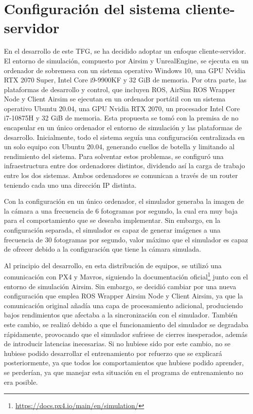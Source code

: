 \section{Configuración del sistema cliente-servidor}
\label{distribución}
En el desarrollo de este TFG, se ha decidido adoptar un enfoque cliente-servidor. El entorno de simulación, compuesto por Airsim y UnrealEngine, se ejecuta en un ordenador de sobremesa con un sistema 
operativo Windows 10, una GPU Nvidia RTX 2070 Super, Intel Core i9-9900KF y 32 GiB de memoria. Por otra parte, las plataformas de desarrollo y control, que incluyen ROS, AirSim ROS Wrapper Node y Client Airsim se ejecutan en un ordenador
portátil con un sistema operativo Ubuntu 20.04, una GPU Nvidia RTX 2070, un procesador Intel Core i7-10875H y 32 GiB de memoria.
Esta propuesta se tomó con la premisa de no encapsular en un único ordenador el entorno de simulación y las plataformas de desarrollo. Inicialmente, todo el sistema 
seguía una configuración centralizada en un solo equipo con Ubuntu 20.04, generando cuellos de botella y limitando al rendimiento del sistema. Para solventar estos problemas, 
se configuró una infraestructura entre dos ordenadores distintos, dividendo así la carga de trabajo entre los dos sistemas. Ambos ordenadores se comunican a través de un router teniendo cada uno una dirección IP distinta. 

Con la configuración en un único ordenador, el simulador generaba la imagen de la cámara a una frecuencia de 6 fotogramas por segundo, la cual era muy baja para el comportamiento que se 
deseaba implementar. Sin embargo, en la configuración separada, el simulador es capaz de generar imágenes a una frecuencia de 30 fotogramas por segundo, valor máximo que el simulador es 
capaz de ofrecer debido a la configuración que tiene la cámara simulada.

Al principio del desarrollo, en esta distribución de equipos, se utilizó una comunicación con PX4 y Mavros, siguiendo la documentación oficial\footnote{\url{https://docs.px4.io/main/en/simulation/}} 
junto con el entorno de simulación Airsim. Sin embargo, se decidió cambiar por una nueva configuración que emplea ROS Wrapper Airsim Node y Client Airsim, ya que 
la comunicación original añadía una capa de procesamiento adicional, produciendo bajos rendimientos que afectaba a la sincronización con el simulador. 
También este cambio, se realizó debido a que el funcionamiento del simulador se degradaba rápidamente, provocando que el simulador sufriese
de cierres inesperados, además de introducir latencias inecesarias. Si no hubiese sido por este cambio, no se hubiese podido desarrollar el entrenamiento por refuerzo que se explicará posteriormente,
ya que todos los comportamientos que hubiese podido aprender, se perderían, ya que manejar esta situación en el programa de entrenamiento no era posible.

